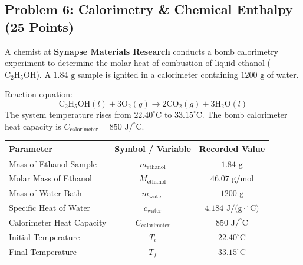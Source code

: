 \documentclass[11pt,a4paper]{article}
\begin{document}
\newpage

\subsection*{Problem 6: Calorimetry \& Chemical Enthalpy (25 Points)}

A chemist at \textbf{Synapse Materials Research} conducts a bomb calorimetry experiment to determine the molar heat of combustion of liquid ethanol ($\text{C}_2\text{H}_5\text{OH}$). A $1.84\text{ g}$ sample is ignited in a calorimeter containing $1200\text{ g}$ of water.

Reaction equation:
\[
\text{C}_2\text{H}_5\text{OH}(l) + 3\text{O}_2(g) \longrightarrow 2\text{CO}_2(g) + 3\text{H}_2\text{O}(l)
\]
The system temperature rises from $22.40^\circ\text{C}$ to $33.15^\circ\text{C}$. The bomb calorimeter heat capacity is $C_{\text{calorimeter}} = 850\text{ J/}^\circ\text{C}$.

\vspace{0.08cm}

\begin{tcolorbox}[basebox, colframe=TealAccent, title={\faDatabase\:\: Experimental Dataset Summary}]
  \centering
  \scriptsize
  \begin{tabularx}{0.95\textwidth}{X c c}
    \toprule
    \textbf{Parameter} & \textbf{Symbol / Variable} & \textbf{Recorded Value} \\
    \midrule
    Mass of Ethanol Sample & $m_{\text{ethanol}}$ & $1.84\text{ g}$ \\
    Molar Mass of Ethanol & $M_{\text{ethanol}}$ & $46.07\text{ g/mol}$ \\
    Mass of Water Bath & $m_{\text{water}}$ & $1200\text{ g}$ \\
    Specific Heat of Water & $c_{\text{water}}$ & $4.184\text{ J/(g}\cdot^\circ\text{C)}$ \\
    Calorimeter Heat Capacity & $C_{\text{calorimeter}}$ & $850\text{ J/}^\circ\text{C}$ \\
    Initial Temperature & $T_i$ & $22.40^\circ\text{C}$ \\
    Final Temperature & $T_f$ & $33.15^\circ\text{C}$ \\
    \bottomrule
  \end{tabularx}
\end{tcolorbox}

\vspace{0.08cm}
\end{document}
